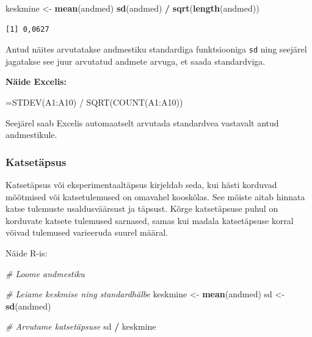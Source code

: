 \documentclass[
]{book}
\newenvironment{Shaded}{\begin{snugshade}}{\end{snugshade}}
\newcommand{\CommentTok}[1]{\textcolor[rgb]{0.56,0.35,0.01}{\textit{#1}}}
\newcommand{\FunctionTok}[1]{\textcolor[rgb]{0.13,0.29,0.53}{\textbf{#1}}}
\newcommand{\NormalTok}[1]{#1}
\newcommand{\OtherTok}[1]{\textcolor[rgb]{0.56,0.35,0.01}{#1}}
\newcommand{\SpecialCharTok}[1]{\textcolor[rgb]{0.81,0.36,0.00}{\textbf{#1}}}
\renewenvironment{Shaded} {\begin{snugshade}\footnotesize} {\end{snugshade}}
\begin{document}
\begin{Shaded}
\begin{Highlighting}[]
\NormalTok{keskmine }\OtherTok{\textless{}{-}} \FunctionTok{mean}\NormalTok{(andmed)}
\FunctionTok{sd}\NormalTok{(andmed) }\SpecialCharTok{/} \FunctionTok{sqrt}\NormalTok{(}\FunctionTok{length}\NormalTok{(andmed))}
\end{Highlighting}
\end{Shaded}

\begin{verbatim}
[1] 0,0627
\end{verbatim}

Antud näites arvutatakse andmestiku standardiga funktsiooniga \texttt{sd} ning seejärel jagatakse see juur arvutatud andmete arvuga, et saada standardviga.

\textbf{Näide Excelis:}

\begin{Shaded}
\begin{Highlighting}[]
\NormalTok{=STDEV(A1:A10) / SQRT(COUNT(A1:A10))}
\end{Highlighting}
\end{Shaded}

Seejärel saab Excelis automaatselt arvutada standardvea vastavalt antud andmestikule.

\subsubsection{Katsetäpsus}\label{katsetuxe4psus}

Katsetäpsus või eksperimentaaltäpsus kirjeldab seda, kui hästi korduvad mõõtmised või katsetulemused on omavahel kooskõlas. See mõiste aitab hinnata katse tulemuste usaldusväärsust ja täpsust. Kõrge katsetäpsuse puhul on korduvate katsete tulemused sarnased, samas kui madala katsetäpsuse korral võivad tulemused varieeruda suurel määral.

Näide R-is:

\begin{Shaded}
\begin{Highlighting}[]
\CommentTok{\# Loome andmestiku}

\CommentTok{\# Leiame keskmise ning standardhälbe}
\NormalTok{keskmine }\OtherTok{\textless{}{-}} \FunctionTok{mean}\NormalTok{(andmed)}
\NormalTok{sd }\OtherTok{\textless{}{-}} \FunctionTok{sd}\NormalTok{(andmed)}

\CommentTok{\# Arvutame katsetäpsuse}
\NormalTok{sd }\SpecialCharTok{/}\NormalTok{ keskmine}
\end{Highlighting}
\end{Shaded}
\end{document}
